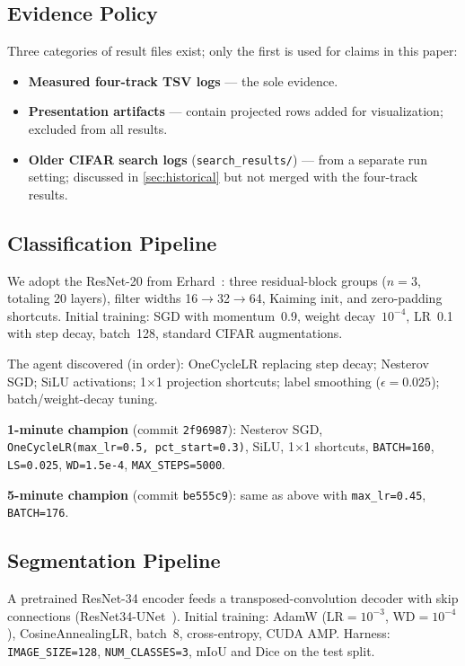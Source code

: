 \documentclass[10pt,twocolumn,letterpaper]{article}
\begin{document}
\subsection{Evidence Policy}

Three categories of result files exist; only the first is used for
claims in this paper:
\begin{itemize}
  \item \textbf{Measured four-track TSV logs} --- the sole evidence.
  \item \textbf{Presentation artifacts} --- contain projected rows
    added for visualization; excluded from all results.
  \item \textbf{Older CIFAR search logs} (\texttt{search\_results/})
    --- from a separate run setting; discussed in
    \cref{sec:historical} but not merged with the four-track results.
\end{itemize}

\subsection{Classification Pipeline}

We adopt the ResNet-20 from Erhard~\cite{erhard2025autoresearch_cifar10}:
three residual-block groups ($n=3$, totaling 20 layers), filter widths
16$\to$32$\to$64, Kaiming init, and zero-padding shortcuts.
Initial training: SGD with momentum~0.9, weight decay~$10^{-4}$,
LR~0.1 with step decay, batch~128, standard CIFAR augmentations.

The agent discovered (in order): OneCycleLR replacing step decay;
Nesterov SGD; SiLU activations; 1$\times$1 projection shortcuts;
label smoothing ($\epsilon=0.025$); batch/weight-decay tuning.

\textbf{1-minute champion} (commit \texttt{2f96987}):
Nesterov SGD, \texttt{OneCycleLR(max\_lr=0.5, pct\_start=0.3)},
SiLU, 1$\times$1 shortcuts, \texttt{BATCH=160},
\texttt{LS=0.025}, \texttt{WD=1.5e-4}, \texttt{MAX\_STEPS=5000}.

\textbf{5-minute champion} (commit \texttt{be555c9}): same
as above with \texttt{max\_lr=0.45}, \texttt{BATCH=176}.

\subsection{Segmentation Pipeline}

A pretrained ResNet-34 encoder feeds a transposed-convolution decoder
with skip connections (ResNet34-UNet~\cite{ronneberger2015u}).
Initial training: AdamW ($\text{LR}=10^{-3}$, WD$=10^{-4}$),
CosineAnnealingLR, batch~8, cross-entropy, CUDA AMP.
Harness: \texttt{IMAGE\_SIZE=128}, \texttt{NUM\_CLASSES=3}, mIoU and
Dice on the test split.
\end{document}
